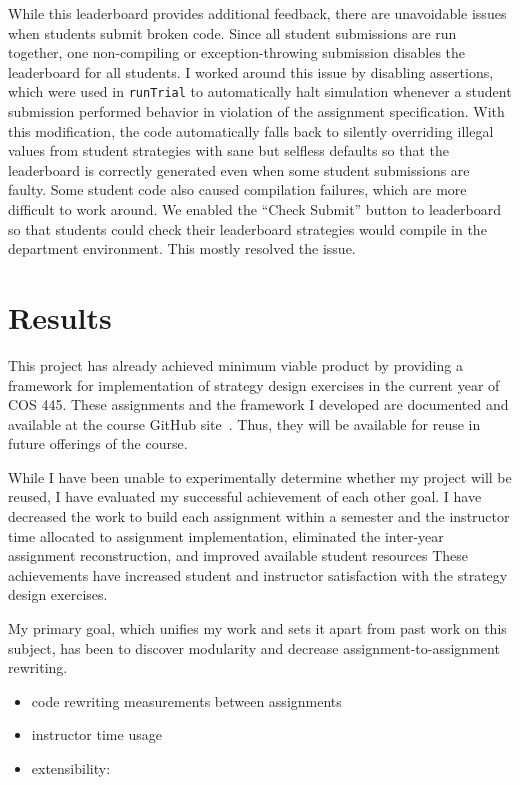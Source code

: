 \documentclass[pageno]{jpaper}
\begin{document}
While this leaderboard provides additional feedback, there are unavoidable issues when students submit broken code.
Since all student submissions are run together, one non-compiling or exception-throwing submission disables the leaderboard for all students.
I worked around this issue by disabling assertions, which were used in \texttt{runTrial} to automatically halt simulation whenever a student submission performed behavior in violation of the assignment specification.
With this modification, the code automatically falls back to silently overriding illegal values from student strategies with sane but selfless defaults so that the leaderboard is correctly generated even when some student submissions are faulty.
Some student code also caused compilation failures, which are more difficult to work around.
We enabled the ``Check Submit'' button to leaderboard so that students could check their leaderboard strategies would compile in the department environment.
This mostly resolved the issue.

\section*{Results}
This project has already achieved minimum viable product by providing a framework for implementation of strategy design exercises in the current year of COS 445.
These assignments and the framework I developed are documented and available at the course GitHub site~\cite{s18}.
Thus, they will be available for reuse in future offerings of the course.

While I have been unable to experimentally determine whether my project will be reused, I have evaluated my successful achievement of each other goal.
I have decreased the work to build each assignment within a semester and the instructor time allocated to assignment implementation, eliminated the inter-year assignment reconstruction, and improved available student resources
These achievements have increased student and instructor satisfaction with the strategy design exercises.

My primary goal, which unifies my work and sets it apart from past work on this subject, has been to discover modularity and decrease assignment-to-assignment rewriting.
\begin{itemize}
\item code rewriting measurements between assignments
\item instructor time usage
\item extensibility:
\end{itemize}
\end{document}
